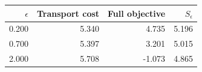 \begin{tabular}{rrrr}
\toprule
$\epsilon$ & Transport cost & Full objective & $S_\epsilon$\\
\midrule
0.200 & 5.340 & 4.735 & 5.196\\
0.700 & 5.397 & 3.201 & 5.015\\
2.000 & 5.708 & -1.073 & 4.865\\
\bottomrule
\end{tabular}
